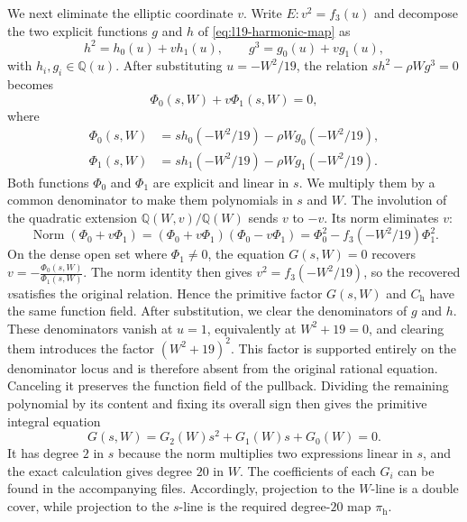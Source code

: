 \documentclass[10pt]{amsart}
\numberwithin{equation}{section}
\theoremstyle{definition}
\theoremstyle{remark}
\newcommand{\Q}{\mathbb{Q}}
\begin{document}
We next eliminate the elliptic coordinate $v$.  Write
$E\colon v^2=f_3(u)$ and decompose the two explicit functions $g$ and $h$ of \ref{eq:l19-harmonic-map} as
\[
 h^2=h_0(u)+v h_1(u),
 \qquad
 g^3=g_0(u)+v g_1(u),
\]
with $h_i,g_i\in\Q(u)$.  After substituting $u=-W^2/19$, the relation
$s h^2-\rho Wg^3=0$ becomes
\[
 \Phi_0(s,W)+v\Phi_1(s,W)=0,
\]
where
\[
 \begin{aligned}
 \Phi_0(s,W)
   &=s h_0(-W^2/19)-\rho Wg_0(-W^2/19),\\
 \Phi_1(s,W)
   &=s h_1(-W^2/19)-\rho Wg_1(-W^2/19).
 \end{aligned}
\]
Both functions $\Phi_0$ and $\Phi_1$ are explicit and linear in $s$. We multiply them by a
common denominator to make them polynomials in $s$ and $W$.  The involution of the quadratic extension $\Q(W,v)/\Q(W)$ sends $v$ to $-v$.  Its norm
eliminates $v$:
\[
 \operatorname{Norm}(\Phi_0+v\Phi_1)
   =(\Phi_0+v\Phi_1)(\Phi_0-v\Phi_1)
   =\Phi_0^2-f_3(-W^2/19)\Phi_1^2.
\]
On the dense open set where $\Phi_1\ne0$, the equation $G(s,W)=0$ recovers $v=-\frac{\Phi_0(s,W)}{\Phi_1(s,W)}$. The norm identity then gives $v^2=f_3(-W^2/19)$, so the recovered $v$satisfies the original relation. Hence the primitive factor $G(s,W)$ and
$C_{\mathrm h}$ have the same function field.
  After substitution, we clear the denominators of $g$ and $h$. These denominators vanish at $u=1$, equivalently at $W^2+19=0$, and clearing them introduces the factor $(W^2+19)^2$. This factor is supported entirely on the denominator locus and is therefore absent from the original rational equation. Canceling it preserves the function field of the pullback. Dividing the remaining polynomial by its content and fixing its overall sign
  then gives the primitive integral equation 
\begin{equation}\label{eq:l19-harmonic-eliminant}
 G(s,W)=G_2(W)s^2+G_1(W)s+G_0(W)=0.
\end{equation}
It has degree $2$ in $s$ because the norm multiplies two expressions linear
in $s$, and the exact calculation gives degree $20$ in $W$. The coefficients of each $G_i$ can be found in the accompanying files. Accordingly,
projection to the $W$-line is a double cover, while projection to the
$s$-line is the required degree-$20$ map $\pi_{\mathrm h}$.
\end{document}
